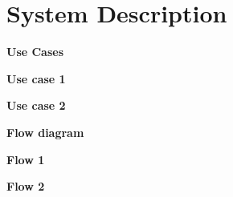 \section{System Description}

\textbf{Use Cases}\\
 \vspace{12pt}

\textbf{Use case 1}\\
 \vspace{12pt}

\textbf{Use case 2}\\
 \vspace{12pt}

\textbf{Flow diagram}\\
 \vspace{12pt}

\textbf{Flow 1}\\
 \vspace{12pt}

\textbf{Flow 2}\\
 \vspace{12pt}
